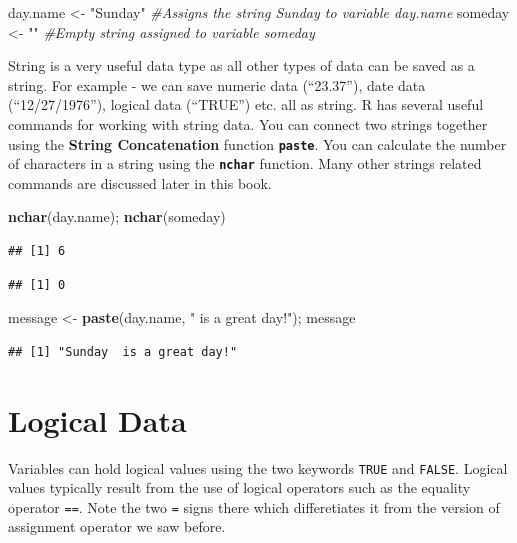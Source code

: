 \documentclass[]{krantz}
\makeatletter
\newenvironment{Shaded}{\begin{snugshade}}{\end{snugshade}}
\newcommand{\KeywordTok}[1]{\textcolor[rgb]{0.27,0.27,0.27}{\textbf{#1}}}
\newcommand{\StringTok}[1]{\textcolor[rgb]{0.5,0.5,0.5}{#1}}
\newcommand{\CommentTok}[1]{\textcolor[rgb]{0.56,0.35,0.01}{\textit{#1}}}
\newcommand{\NormalTok}[1]{#1}
\newenvironment{kframe}{%
\medskip{}
\setlength{\fboxsep}{.8em}
 \def\at@end@of@kframe{}%
 \ifinner\ifhmode%
  \def\at@end@of@kframe{\end{minipage}}%
  \begin{minipage}{\columnwidth}%
 \fi\fi%
 \def\FrameCommand##1{\hskip\@totalleftmargin \hskip-\fboxsep
 \colorbox{shadecolor}{##1}\hskip-\fboxsep
     \hskip-\linewidth \hskip-\@totalleftmargin \hskip\columnwidth}%
 \MakeFramed {\advance\hsize-\width
   \@totalleftmargin\z@ \linewidth\hsize
   \@setminipage}}%
 {\par\unskip\endMakeFramed%
 \at@end@of@kframe}
\renewenvironment{Shaded}{\begin{kframe}}{\end{kframe}}
\theoremstyle{definition}
\theoremstyle{definition}
\theoremstyle{definition}
\theoremstyle{remark}
\makeatother
\begin{document}
\begin{Shaded}
\begin{Highlighting}[]
\NormalTok{day.name <-}\StringTok{ "Sunday"} \CommentTok{#Assigns the string Sunday to variable day.name}
\NormalTok{someday <-}\StringTok{ ""} \CommentTok{#Empty string assigned to variable someday}
\end{Highlighting}
\end{Shaded}

String is a very useful data type as all other types of data can be
saved as a string. For example - we can save numeric data (``23.37''),
date data (``12/27/1976''), logical data (``TRUE'') etc. all as string.
R has several useful commands for working with string data. You can
connect two strings together using the \textbf{String Concatenation}
function \textbf{\texttt{paste}}. You can calculate the number of
characters in a string using the \textbf{\texttt{nchar}} function. Many
other strings related commands are discussed later in this book.

\begin{Shaded}
\begin{Highlighting}[]
\KeywordTok{nchar}\NormalTok{(day.name); }\KeywordTok{nchar}\NormalTok{(someday)}
\end{Highlighting}
\end{Shaded}

\begin{verbatim}
## [1] 6
\end{verbatim}

\begin{verbatim}
## [1] 0
\end{verbatim}

\begin{Shaded}
\begin{Highlighting}[]
\NormalTok{message <-}\StringTok{ }\KeywordTok{paste}\NormalTok{(day.name, }\StringTok{" is a great day!"}\NormalTok{); message}
\end{Highlighting}
\end{Shaded}

\begin{verbatim}
## [1] "Sunday  is a great day!"
\end{verbatim}

\section{Logical Data}\label{logical-data}

Variables can hold logical values using the two keywords \texttt{TRUE}
and \texttt{FALSE}. Logical values typically result from the use of
logical operators such as the equality operator \texttt{==}. Note the
two \texttt{=} signs there which differetiates it from the version of
assignment operator we saw before.
\end{document}
